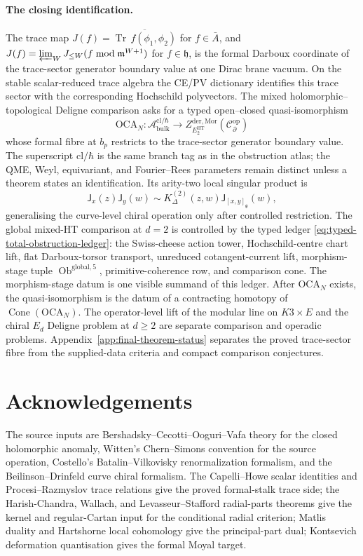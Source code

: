 \documentclass[11pt]{memoir}
\begin{document}


\paragraph{The closing identification.}
The trace map
$J(f)=\overline{\operatorname{Tr}\,f(\phi_1,\phi_2)}$ for \(f\in\bar A\),
and
\(J(f)=\varprojlim_WJ_{\leq W}(f\bmod\mathfrak m^{W+1})\) for
\(f\in\mathfrak h\), is the formal Darboux coordinate of the
trace-sector generator boundary value at one Dirac brane vacuum.  On
the stable scalar-reduced trace algebra the
CE/PV dictionary identifies this trace sector with the corresponding
Hochschild polyvectors.  The mixed holomorphic--topological Deligne
comparison asks for a typed open--closed quasi-isomorphism
\[
  \mathrm{OCA}_N\colon
  \mathcal A^{\mathrm{cl}/\hbar}_{\mathrm{bulk}}
  \longrightarrow
  Z^{\mathrm{der},\mathrm{Mor}}_{E_2^{\mathrm{HT}}}
  (\mathcal C^{\mathrm{op}}_\partial)
\]
whose formal fibre at \(b_p\) restricts to the trace-sector generator
boundary value.  The superscript \(\mathrm{cl}/\hbar\) is the same branch
tag as in the obstruction atlas; the QME, Weyl, equivariant, and
Fourier--Rees parameters remain distinct unless a theorem states an
identification.  Its
arity-two local singular product is
\[
  \mathsf{J}_x(z)\mathsf{J}_y(w)
  \sim
  K^{(2)}_\Delta(z,w)\mathsf{J}_{[x,y]_{\mathfrak g}}(w),
\]
generalising the curve-level chiral operation only after controlled
restriction.  The global mixed-HT comparison at \(d=2\) is controlled
by the typed ledger \eqref{eq:typed-total-obstruction-ledger}: the
Swiss-cheese action tower, Hochschild-centre chart lift, flat
Darboux-torsor transport, unreduced cotangent-current lift,
morphism-stage tuple \(\operatorname{Ob}^{\mathrm{global},5}\),
primitive-coherence row, and comparison cone.  The morphism-stage datum
is one visible summand of this ledger.  After \(\mathrm{OCA}_N\) exists,
the quasi-isomorphism is the datum of a contracting homotopy of
\(\operatorname{Cone}(\mathrm{OCA}_N)\).  The operator-level lift of the
modular line on \(K3\times E\) and the chiral \(E_d\) Deligne problem
at \(d\geq2\) are separate comparison and operadic problems.
Appendix~\ref{app:final-theorem-status} separates the proved
trace-sector fibre from the supplied-data criteria and compact comparison
conjectures.

\section*{Acknowledgements}
The source inputs are Bershadsky--Cecotti--Ooguri--Vafa theory for the
closed holomorphic anomaly, Witten's Chern--Simons convention for the
source operation, Costello's Batalin--Vilkovisky renormalization
formalism, and the Beilinson--Drinfeld curve chiral formalism.  The
Capelli--Howe scalar identities and Procesi--Razmyslov trace relations
give the proved formal-stalk trace side; the Harish-Chandra, Wallach,
and Levasseur--Stafford radial-parts theorems give the kernel and
regular-Cartan input for the conditional radial criterion; Matlis
duality and Hartshorne local cohomology give the principal-part dual;
Kontsevich deformation quantisation gives the formal Moyal target.
\end{document}
